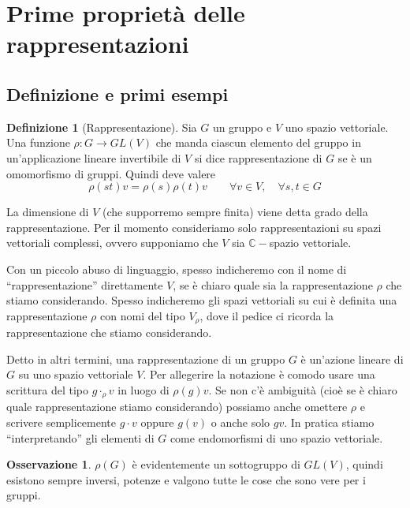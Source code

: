 \documentclass[11pt]{article}
\theoremstyle{plain}
\theoremstyle{definition}
\newtheorem{defn}{Definizione}[section]
\newtheorem*{rem}{Osservazione}
\theoremstyle{remark}
\newcommand{\C}{\mathbb{C}}
\begin{document}
\newpage
\section{Prime proprietà delle rappresentazioni}
\subsection{Definizione e primi esempi}
\begin{defn}[Rappresentazione]
	Sia $G$ un gruppo e $V$ uno spazio vettoriale. Una funzione $\rho: G \to GL(V)$ che manda ciascun elemento del gruppo in un'applicazione lineare invertibile di $V$
	si dice rappresentazione di $G$ se è un omomorfismo di gruppi. Quindi deve valere
	\[ \rho(st) v = \rho(s)\rho(t) v \qquad \forall v \in V, \quad \forall s,t \in G\]
\end{defn}

La dimensione di $V$ (che supporremo sempre finita) viene detta grado della rappresentazione.
Per il momento consideriamo solo rappresentazioni su spazi vettoriali complessi, ovvero supponiamo che $V$ sia $\C-$spazio vettoriale.

Con un piccolo abuso di linguaggio, spesso indicheremo con il nome di ``rappresentazione'' direttamente $V$, se è chiaro quale sia
la rappresentazione $\rho$ che stiamo considerando. Spesso indicheremo gli spazi vettoriali
su cui è definita una rappresentazione $\rho$ con nomi del tipo $V_\rho$, dove il pedice ci ricorda la rappresentazione che stiamo considerando.

Detto in altri termini, una rappresentazione di un gruppo $G$ è un'azione lineare di $G$ su uno spazio vettoriale $V$.
Per allegerire la notazione è comodo usare una scrittura del tipo $g\cdot_\rho v$ in luogo di $\rho(g)v$.
Se non c'è ambiguità (cioè se è chiaro quale rappresentazione stiamo considerando)
possiamo anche omettere $\rho$ e scrivere semplicemente $g\cdot v$ oppure $g(v)$ o anche solo $gv$.
In pratica stiamo ``interpretando'' gli elementi di $G$ come endomorfismi di uno spazio vettoriale.

\begin{rem}
$\rho(G)$ è evidentemente un sottogruppo di $GL(V)$, quindi esistono sempre inversi, potenze e valgono tutte le cose che sono vere per i gruppi.
\end{rem}
\end{document}
